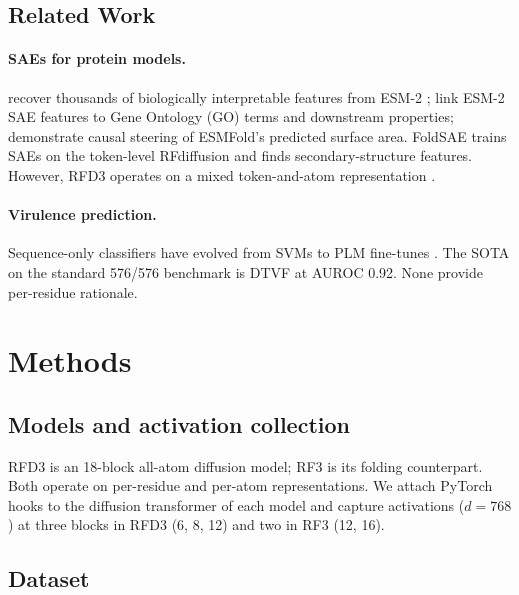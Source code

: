 \documentclass{article}
\begin{document}
\subsection{Related Work}
\label{sec:related}

\paragraph{SAEs for protein models.}
\citet{simon2025interplm} recover thousands of biologically interpretable features from ESM-2 \cite{lin2023evolutionaryscale}; \citet{adams2025mechanistic} link ESM-2 SAE features to Gene Ontology (GO) terms and downstream properties; \citet{parsan2025interpretable} demonstrate causal steering of ESMFold's predicted surface area. FoldSAE \cite{zarzecki2025foldsae} trains SAEs on the token-level RFdiffusion \cite{watson2023rfdiffusion} and finds secondary-structure features. However, RFD3 operates on a mixed token-and-atom representation \cite{krishna2024rfaa,abramson2024alphafold3}.

\paragraph{Virulence prediction.}
Sequence-only classifiers have evolved from SVMs \cite{garg2008virulentpred} to PLM fine-tunes \cite{sun2024dtvf,chen2025virulenthunter}. The SOTA on the standard 576/576 benchmark is DTVF \cite{sun2024dtvf} at AUROC 0.92. None provide per-residue rationale.



\section{Methods}
\label{sec:methods}

\subsection{Models and activation collection}

RFD3 \cite{butcher2025rfdiffusion3} is an 18-block all-atom diffusion model; RF3 \cite{krishna2024rfaa} is its folding counterpart. Both operate on per-residue and per-atom representations. We attach PyTorch hooks to the diffusion transformer of each model and capture activations ($d = 768$) at three blocks in RFD3 (6, 8, 12) and two in RF3 (12, 16).

\subsection{Dataset}
\end{document}
